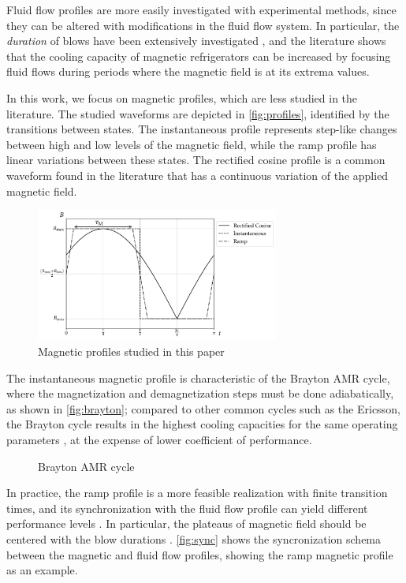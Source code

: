 \documentclass[draft]{svjour3}
\begin{document}
Fluid flow profiles are more easily investigated with experimental methods, since they can be altered with modifications in the fluid flow system. In particular, the \emph{duration} of blows have been extensively investigated \cite{bib:teyber17_exper,bib:nakashima18-influen-exp,FORTKAMP2018}, and the literature shows that the cooling capacity of magnetic refrigerators can be increased by focusing fluid flows during periods where the magnetic field is at its extrema values.

In this work, we focus on magnetic profiles, which are less studied in the literature. The studied waveforms are depicted in \autoref{fig:profiles}, identified by the transitions between states. The instantaneous profile represents step-like changes between high and low levels of the magnetic field, while the ramp profile has linear variations between these states. The rectified cosine profile is a common waveform found in the literature that has a continuous variation of the applied magnetic field.

\begin{figure}[!ht]
  \centering
  \includegraphics[width=8cm]{profiles_all}
  \caption{Magnetic profiles studied in this paper}
  \label{fig:profiles}
\end{figure}

The instantaneous magnetic profile is characteristic of the Brayton AMR cycle, where the magnetization and demagnetization steps must be done adiabatically, as shown in \autoref{fig:brayton}; compared to other common cycles such as the Ericsson, the Brayton cycle results in the highest cooling capacities for the same operating  parameters \cite{bib:kitanovski}, at the expense of lower coefficient of performance.


\begin{figure}[!ht]
  \centering
  
  \caption{Brayton AMR cycle}
  \label{fig:brayton}
\end{figure}

 In practice, the ramp profile is a more feasible realization with finite transition times, and its synchronization with the fluid flow profile can yield different performance levels \cite{TUSEK20111507}. In particular, the plateaus of magnetic field should be centered with the blow durations \cite{bib:bjoerk11_amr}.
\autoref{fig:sync} shows the syncronization schema between the magnetic and fluid flow profiles, showing the ramp magnetic profile as an example. 
\end{document}
